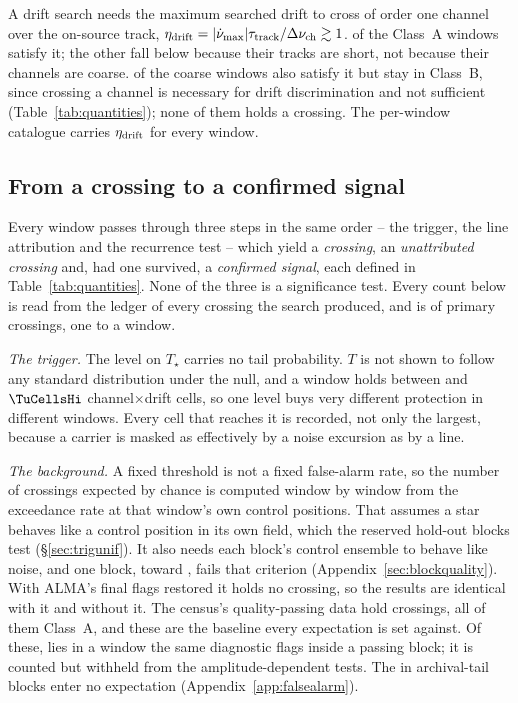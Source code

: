A drift search needs the maximum searched drift to cross of order one channel
over the on-source track, $\eta_{\rm drift} = |\dot\nu_{\max}|\tau_{\rm
track}/\Delta\nu_{\rm ch} \gtrsim 1$. \EtaDriftAOk{} of the \NWinA{} Class~A
windows satisfy it; the other \EtaDriftALo{} fall below because their tracks
are short, not because their channels are coarse. \EtaDriftBHi{} of the
\NWinB{} coarse windows also satisfy it but stay in Class~B, since crossing a
channel is necessary for drift discrimination and not sufficient
(Table~\ref{tab:quantities}); none of them holds a crossing. The per-window
catalogue carries $\eta_{\rm drift}$ for every window.

\subsection{From a crossing to a confirmed signal}
\label{sec:summary}

Every window passes through three steps in the same order -- the trigger, the
line attribution and the recurrence test -- which yield a \emph{crossing}, an
\emph{unattributed crossing} and, had one survived, a \emph{confirmed signal},
each defined in Table~\ref{tab:quantities}. None of the three is a
significance test. Every count below is read from the ledger of every crossing
the search produced, and is of primary crossings, one to a window.

\emph{The trigger.} The level on $T_\star$ carries no tail probability. $T$ is
not shown to follow any standard distribution under the null, and a window
holds between \TuCellsLo{} and $\TuCellsHi$ channel$\times$drift cells, so one
level buys very different protection in different windows. Every cell that
reaches it is recorded, not only the largest, because a carrier is masked as
effectively by a noise excursion as by a line.

\emph{The background.} A fixed threshold is not a fixed false-alarm rate, so
the number of crossings expected by chance is computed window by window from
the exceedance rate at that window's own control positions. That assumes a
star behaves like a control position in its own field, which the reserved
hold-out blocks test (\S\ref{sec:trigunif}). It also needs each block's
control ensemble to behave like noise, and one block, \BqFailBlock{} toward
\BqFailStar, fails that criterion (Appendix~\ref{sec:blockquality}). With
ALMA's final flags restored it holds no crossing, so the results are identical
with it and without it. The census's quality-passing data hold \CsNCrossQp{} crossings, all
of them Class~A, and these are the baseline every expectation is set against.
Of these, \BkFlagNCrossOther{} lies in a window the same diagnostic flags inside
a passing block; it is counted but withheld from the amplitude-dependent
tests. The \CeNTailCrossWord{} in archival-tail blocks enter no expectation
(Appendix~\ref{app:falsealarm}).

